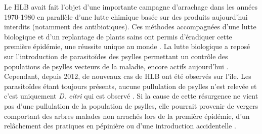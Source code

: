 \documentclass[
  11pt,
  french,
  a4paper,
  extrafontsizes,onecolumn,openright
  ]{memoir}
\begin{document}
Le HLB avait fait l'objet d'une importante campagne d'arrachage dans les années 1970-1980 en parallèle d'une lutte chimique basée sur des produits aujourd'hui interdits (notamment des antibiotiques). Ces méthodes accompagnées d'une lutte biologique et d'un replantage de plants sains ont permis d'éradiquer cette première épidémie, une réussite unique au monde \autocite{gottwald_preliminary_1989}. La lutte biologique a reposé sur l'introduction de parasitoïdes des psylles permettant un contrôle des populations de psylles vecteurs de la maladie, encore actifs aujourd'hui \autocite{aubert_case_1996}. Cependant, depuis 2012, de nouveaux cas de HLB ont été observés sur l'île. Les parasitoïdes étant toujours présents, aucune pullulation de psylles n'est relevée et c'est uniquement \emph{D. citri} qui est observé \autocite{guilloteau_utilisation_2018}. Si la cause de cette résurgence ne vient pas d'une pullulation de la population de psylles, elle pourrait provenir de vergers comportant des arbres malades non arrachés lors de la première épidémie, d'un relâchement des pratiques en pépinière ou d'une introduction accidentelle \autocite{guilloteau_utilisation_2018}.
\end{document}
